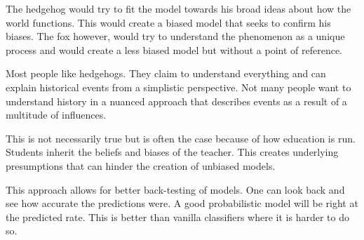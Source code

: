 \documentclass[12pt]{article}
\begin{document}


\begin{enumerate}


The hedgehog would try to fit the model towards his broad ideas about how the world functions. This would create a biased model that seeks to confirm his biases. The fox however, would try to understand the phenomenon as a unique process and would create a less biased model but without a point of reference. 


Most people like hedgehogs. They claim to understand everything and can explain historical events from a simplistic perspective. Not many people want to understand history in a nuanced approach that describes events as a result of a multitude of influences.


This is not necessarily true but is often the case because of how education is run. Students inherit the beliefs and biases of the teacher. This creates underlying presumptions that can hinder the creation of unbiased models. 


This approach allows for better back-testing of models. One can look back and see how accurate the predictions were. A good probabilistic model will be right at the predicted rate. This is better than vanilla classifiers where it is harder to do so. 


\end{enumerate}
\end{document}
